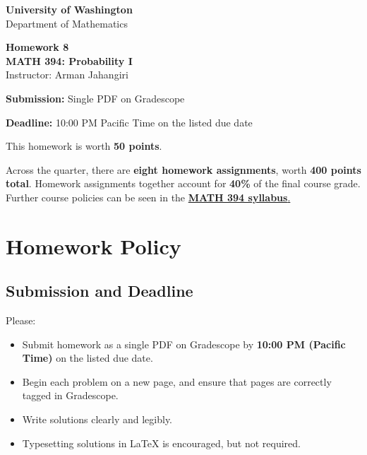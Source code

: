\documentclass[11pt]{article}
\newcommand{\course}{MATH 394: Probability I}
\newcommand{\department}{Department of Mathematics}
\newcommand{\university}{University of Washington}
\begin{document}
\begin{titlepage}
\centering
\vspace*{1.2cm}

{\Large \textbf{\university}}\\
{\large \department}

\vspace{1.5cm}

{\Huge \color{uwpurple}\textbf{Homework 8}}\\[0.25cm]
{\Large \textbf{\course}}\\[0.25cm]
{\large Instructor: Arman Jahangiri}

\vspace{1cm}

\begin{tcolorbox}[width=0.78\textwidth,colback=softpurple,colframe=uwpurple,boxrule=0.9pt,arc=3mm]
\centering
\textbf{Submission:} Single PDF on Gradescope

\textbf{Deadline:} 10:00 PM Pacific Time on the listed due date
\end{tcolorbox}

\vspace{0.8cm}

\begin{tcolorbox}[width=0.86\textwidth,colback=white,colframe=uwgold,boxrule=0.8pt,arc=3mm]
This homework is worth \textbf{50 points}.

Across the quarter, there are \textbf{eight homework assignments}, worth \textbf{400 points total}. Homework assignments together account for \textbf{40\%} of the final course grade. Further course policies can be seen in the \href{https://armanjg.github.io/MATH-394-Probability-1-v2/}{\textbf{MATH 394 syllabus}.}
\end{tcolorbox}

\vfill
\end{titlepage}

\section*{Homework Policy}

\subsection*{Submission and Deadline}

Please:

\begin{itemize}[leftmargin=*]
    \item Submit homework as a single PDF on Gradescope by \textbf{10:00 PM (Pacific Time)} on the listed due date.
    \item Begin each problem on a new page, and ensure that pages are correctly tagged in Gradescope.
    \item Write solutions clearly and legibly.
    \item Typesetting solutions in LaTeX is encouraged, but not required.
\end{itemize}
\end{document}
